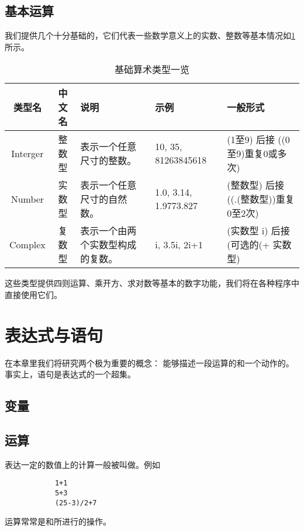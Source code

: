 \documentclass[a4paper]{tufte-book}
\begin{document}
		\section{基本运算}
			我们提供几个十分基础的，它们代表一些数学意义上的实数、整数等基本情况如\ref{ls:1}所示。
			\begin{table}
			\caption{基础算术类型一览}
			\label{ls:1}
			\centering
			\begin{tabularx}{4in}{ccXXX}
				
					\toprule
						类型名 &
						中文名 &
						说明 &
						示例 &
						一般形式 \\
					\midrule
					
						Interger &
						整数型 &
						表示一个任意尺寸的整数。 &
						10, 35, 81263845618 &
						(1至9) 后接 ((0至9)重复0或多次)\footnotemark[2]
						\\
					\midrule
						
						Number &
						实数型\footnotemark[3] &
						表示一个任意尺寸的自然数。 &
						1.0, 3.14,
						1.9773.827\footnotemark[4] &
						(整数型) 后接 ((.(整数型))重复0至2次) \\
					\midrule
						
						Complex &
						复数型 & 
						表示一个由两个实数型构成的复数。 &
						i, 3.5i, 2i+1 &
						(实数型 i) 后接 (可选的(+ 实数型) \\
						
					\bottomrule
			\end{tabularx}
			\end{table}
			
			这些类型提供四则运算、乘开方、求对数等基本的数字功能，我们将在各种程序中直接使用它们。
			
	\chapter{表达式与语句}
		在本章里我们将研究两个极为重要的概念：
		能够描述一段运算的和一个动作的。
		事实上，语句是表达式的一个超集。
		\section{变量}
			
		\section{运算}
			表达一定的数值上的计算一般被叫做。例如
			\begin{verbatim}
			1+1
			5+3
			(25-3)/2+7
			\end{verbatim}
			运算常常是和所进行的操作。
			
\end{document}
